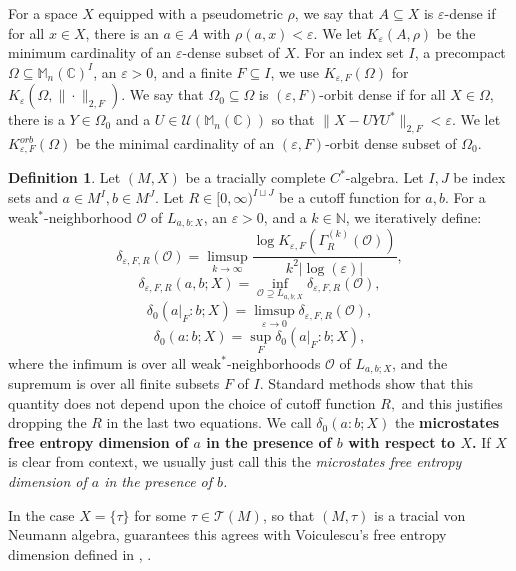 \documentclass[10pt]{amsart}
\theoremstyle{definition}
\newtheorem{defn}[thm]{Definition}
\numberwithin{equation}{section}
\newcommand{\bC}{{\mathbb C}}
\newcommand{\bM}{{\mathbb M}}
\newcommand{\bN}{{\mathbb N}}
\newcommand{\cT}{{\mathcal T}}
\newcommand{\cU}{{\mathcal U}}
\begin{document}
For a space $X$ equipped with a pseudometric $\rho$, we say that $A\subseteq X$ is $\varepsilon$-dense if for all $x\in X$, there is an $a\in A$ with $\rho(a,x)<\varepsilon$. We let $K_{\varepsilon}(A,\rho)$ be the minimum cardinality of an $\varepsilon$-dense subset of $X$. 
For an index set $I$, a precompact $\Omega\subseteq \bM_{n}(\bC)^{I}$, an $\varepsilon>0$, and a finite $F\subseteq I$, we use $K_{\varepsilon,F}(\Omega)$ for $K_{\varepsilon}(\Omega,\|\cdot\|_{2,F})$. 
We say that $\Omega_{0}\subseteq\Omega$ is $(\varepsilon,F)$-orbit dense if for all $X\in \Omega$, there is a $Y\in \Omega_{0}$ and a $U\in \cU(\bM_{n}(\bC))$ so that $\|X-UYU^{*}\|_{2,F}<\varepsilon$. 
We let $K_{\varepsilon,F}^{orb}(\Omega)$ be the minimal cardinality of an $(\varepsilon,F)$-orbit dense subset of $\Omega_{0}$.

\begin{defn}
Let $(M,X)$ be a tracially complete $C^{*}$-algebra. Let $I,J$ be index sets and $a\in M^{I},b\in M^{J}$. Let $R\in [0,\infty)^{I\sqcup J}$ be a cutoff function for $a,b$. For a weak$^{*}$-neighborhood $\mathcal{O}$ of $L_{a,b:X}$, an $\varepsilon>0$, and a $k\in \bN$,  we iteratively define:
\[\delta_{\varepsilon,F,R}(\mathcal{O})=\limsup_{k\to\infty}\frac{\log K_{\varepsilon,F}(\Gamma^{(k)}_{R}(\mathcal{O}))}{k^{2}|\log(\varepsilon)|},\]
\[\delta_{\varepsilon,F,R}(a,b;X)=\inf_{\mathcal{O}\supseteq L_{a,b;X}}\delta_{\varepsilon,F,R}(\mathcal{O}),\]
\[\delta_{0}(a|_{F}:b;X)=\limsup_{\varepsilon\to 0}\delta_{\varepsilon,F,R}(\mathcal{O}),\]
\[\delta_{0}(a:b;X)=\sup_{F}\delta_{0}(a|_{F}:b;X),\]
where the infimum is over all weak$^{*}$-neighborhoods $\mathcal{O}$ of $L_{a,b;X}$, and the supremum is over all finite subsets $F$ of $I$. 
Standard methods show that this quantity does not depend upon the choice of cutoff function $R,$ and this justifies dropping the $R$ in the last two equations. We call $\delta_{0}(a:b;X)$ the \textbf{microstates free entropy dimension of $a$ in the presence of $b$ with respect to $X$.} If $X$ is clear from context, we usually just call this the \emph{microstates free entropy dimension of $a$ in the presence of $b$.}
\end{defn}

In the case $X=\{\tau\}$ for some $\tau\in \cT(M)$, so that $(M,\tau)$ is a tracial von Neumann algebra, \cite[Corollary 2.4]{JungLemma} guarantees this agrees with Voiculescu's free entropy dimension defined in \cite[Section 6]{VoiculescuFreeEntropy2}, \cite[Section6]{Voiculescu1996}.
\end{document}
